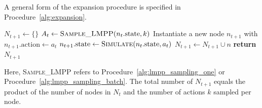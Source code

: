 A general form of the expansion procedure is specified in Procedure~\ref{alg:expansion}.

\begin{procedure}[h!]
\caption{Expansion} 
\label{alg:expansion}
\small
\noindent
\begin{algorithmic}[1]
        \State $N_{t+1} \gets \{\}$ 
            \State $A_t \gets \text{\textsc{Sample\_LMPP}}(n_t.\text{state}, k)$ 
                \State Instantiate a new node $n_{t+1}$ with $n_{t+1}.\text{action} \gets a_t$
                \State $n_{t+1}.\text{state} \gets \text{\textsc{Simulate}}(n_t.\text{state}, a_t)$
                \State $N_{t+1} \gets N_{t+1} \cup n$
            \EndFor
        \EndFor
        \State \textbf{return} $N_{t+1}$
        \EndProcedure
\end{algorithmic}
\end{procedure}
Here, \textsc{Sample\_LMPP} refers to Procedure~\ref{alg:lmpp_sampling_one} or Procedure~\ref{alg:lmpp_sampling_batch}. The total number of $N_{t+1}$ equals the product of the number of nodes in $N_t$ and the number of actions $k$ sampled per node.



